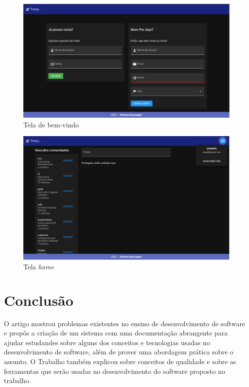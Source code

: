 \documentclass[12pt]{article}
\begin{document}
\begin{figure}[H]
    \centering
    \includegraphics[width=1\textwidth]{prints/welcome.png}
    \caption{Tela de bem-vindo}\label{fig:welcome}
\end{figure}

\begin{figure}[H]
    \centering
    \includegraphics[width=1\textwidth]{prints/home.png}
    \caption{Tela \textit{home}}\label{fig:home}
\end{figure}

\section{Conclusão}

O artigo mostrou problemas existentes no ensino de desenvolvimento de software e propôs
a criação de um sistema com uma documentação abrangente para ajudar estudandes sobre alguns dos
conceitos e tecnologias usadas no desenvolvimento de software, além de prover uma abordagem prática
sobre o assunto. O Trabalho também explicou sobre conceitos de qualidade e sobre as ferramentas que
serão usadas no desenvolvimento do software proposto no trabalho.


\end{document}
